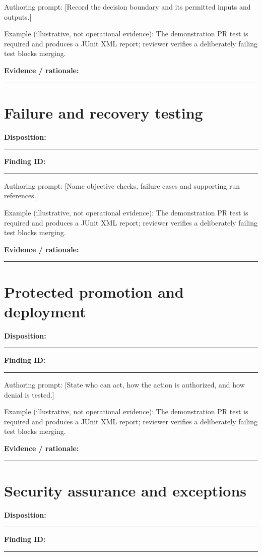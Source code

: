 \documentclass[11pt,letterpaper]{article}
\begin{document}
Authoring prompt: [Record the decision boundary and its permitted inputs and outputs.]

Example (illustrative, not operational evidence): The demonstration PR test is required and produces a JUnit XML report; reviewer verifies a deliberately failing test blocks merging.

\noindent\textbf{Evidence / rationale:}\par\nobreak\vspace{8pt}\noindent\rule{0.93\linewidth}{0.4pt}\par\vspace{14pt}
\section{Failure and recovery testing}
\noindent\textbf{Disposition:}\rule{2.5cm}{0.4pt}\quad\textbf{Finding ID:}\rule{4cm}{0.4pt}

Authoring prompt: [Name objective checks, failure cases and supporting run references.]

Example (illustrative, not operational evidence): The demonstration PR test is required and produces a JUnit XML report; reviewer verifies a deliberately failing test blocks merging.

\noindent\textbf{Evidence / rationale:}\par\nobreak\vspace{8pt}\noindent\rule{0.93\linewidth}{0.4pt}\par\vspace{14pt}
\section{Protected promotion and deployment}
\noindent\textbf{Disposition:}\rule{2.5cm}{0.4pt}\quad\textbf{Finding ID:}\rule{4cm}{0.4pt}

Authoring prompt: [State who can act, how the action is authorized, and how denial is tested.]

Example (illustrative, not operational evidence): The demonstration PR test is required and produces a JUnit XML report; reviewer verifies a deliberately failing test blocks merging.

\noindent\textbf{Evidence / rationale:}\par\nobreak\vspace{8pt}\noindent\rule{0.93\linewidth}{0.4pt}\par\vspace{14pt}
\section{Security assurance and exceptions}
\noindent\textbf{Disposition:}\rule{2.5cm}{0.4pt}\quad\textbf{Finding ID:}\rule{4cm}{0.4pt}
\end{document}
